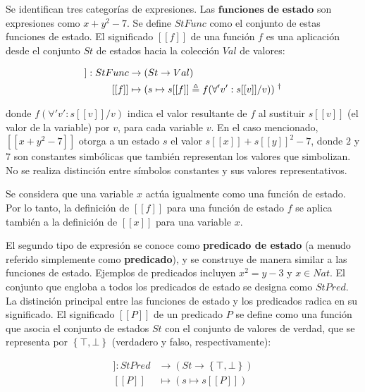 Se identifican tres categorías de expresiones. Las $\textbf{funciones de estado}$ son expresiones como $x + y^2 - 7$. Se define $StFunc$ como el conjunto de estas funciones de estado. El significado $[[f]]$ de una función $f$ es una aplicación desde el conjunto $St$ de estados hacia la colección $Val$ de valores:

\begin{align*}
[[\cdot]] : StFunc &\to (St \to Val) \\
[[f]] &\mapsto (s \mapsto s[[f]] \triangleq f(\forall 'v' : s[[v]] / v)) \hspace{0.1cm}\textsuperscript{\dag}
\end{align*}



donde $f(\forall 'v' : s[[v]]/v)$ indica el valor resultante de $f$ al sustituir $s[[v]]$ (el valor de la variable) por $v$, para cada variable $v$. En el caso mencionado, $[[x + y^2 - 7]]$ otorga a un estado $s$ el valor $s[[x]] + s[[y]]^2 -7$, donde $2$ y $7$ son constantes simbólicas que también representan los valores que simbolizan. No se realiza distinción entre símbolos constantes y sus valores representativos.

Se considera que una variable $x$ actúa igualmente como una función de estado. Por lo tanto, la definición de $[[f]]$ para una función de estado $f$ se aplica también a la definición de $[[x]]$ para una variable $x$.

El segundo tipo de expresión se conoce como \textbf{predicado de estado} (a menudo referido simplemente como \textbf{predicado}), y se construye de manera similar a las funciones de estado. Ejemplos de predicados incluyen $x^2 = y -3$ y $x \in Nat$. El conjunto que engloba a todos los predicados de estado se designa como $StPred$. La distinción principal entre las funciones de estado y los predicados radica en su significado. El significado $[[P]]$ de un predicado $P$ se define como una función que asocia el conjunto de estados $St$ con el conjunto de valores de verdad, que se representa por $\left\lbrace \top, \bot\right\rbrace$ (verdadero y falso, respectivamente):

\begin{align*}
[[\cdot]] : StPred &\to (St \to \left\lbrace \top, \bot \right\rbrace) \\
[[P]] &\mapsto (s \mapsto s[[P]])
\end{align*}


